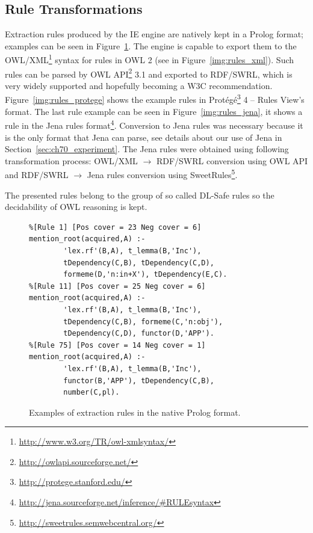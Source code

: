 \subsection{Rule Transformations}


Extraction rules produced by the IE engine are natively kept in a Prolog format; examples can be seen in Figure~\ref{img:rules_prolog}. The engine is capable to export them to the OWL/XML\footnote{\url{http://www.w3.org/TR/owl-xmlsyntax/}} syntax for rules in OWL 2 \citep{GHPP09a} (see in Figure~\ref{img:rules_xml}). Such rules can be parsed by OWL API\footnote{\url{http://owlapi.sourceforge.net/}} 3.1 
and exported to RDF/SWRL, which is very widely supported and hopefully becoming a W3C recommendation.
Figure~\ref{img:rules_protege} shows the example rules in Prot\'{e}g\'{e}\footnote{\url{http://protege.stanford.edu/}} 4 -- Rules View's format. The last rule example can be seen in Figure~\ref{img:rules_jena}, it shows a rule in the Jena rules format\footnote{\url{http://jena.sourceforge.net/inference/#RULEsyntax}}. Conversion to Jena rules was necessary because it is the only format that Jena can parse, see details about our use of Jena in Section~\ref{sec:ch70_experiment}. The Jena rules were obtained using following transformation process: OWL/XML $\rightarrow$ RDF/SWRL conversion using OWL API and RDF/SWRL $\rightarrow$ Jena rules conversion using SweetRules\footnote{\url{http://sweetrules.semwebcentral.org/}}.

The presented rules belong to the group of so called DL-Safe rules \citep{Motik:DL-Safe-rules} so the decidability of OWL reasoning is kept.




\begin{figure}
\begin{verbatim}
%[Rule 1] [Pos cover = 23 Neg cover = 6]
mention_root(acquired,A) :-
		'lex.rf'(B,A), t_lemma(B,'Inc'),
		tDependency(C,B), tDependency(C,D),
		formeme(D,'n:in+X'), tDependency(E,C).
%[Rule 11] [Pos cover = 25 Neg cover = 6]
mention_root(acquired,A) :-
		'lex.rf'(B,A), t_lemma(B,'Inc'),
		tDependency(C,B), formeme(C,'n:obj'),
		tDependency(C,D), functor(D,'APP').
%[Rule 75] [Pos cover = 14 Neg cover = 1]
mention_root(acquired,A) :-
		'lex.rf'(B,A), t_lemma(B,'Inc'),
		functor(B,'APP'), tDependency(C,B),
		number(C,pl).							
\end{verbatim}
	\caption{Examples of extraction rules in the native Prolog format.}
	\label{img:rules_prolog}
\end{figure}

